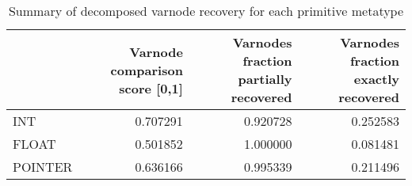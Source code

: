 \begin{table}
\centering
\caption{Summary of decomposed varnode recovery for each primitive metatype}
\label{table:metatype-recovery-summary-decomposed}
\begin{tabular}{lrrr}
\toprule
{} &  Varnode comparison score [0,1] &  Varnodes fraction partially recovered &  Varnodes fraction exactly recovered \\
\midrule
INT     &                        0.707291 &                               0.920728 &                             0.252583 \\
FLOAT   &                        0.501852 &                               1.000000 &                             0.081481 \\
POINTER &                        0.636166 &                               0.995339 &                             0.211496 \\
\bottomrule
\end{tabular}
\end{table}
